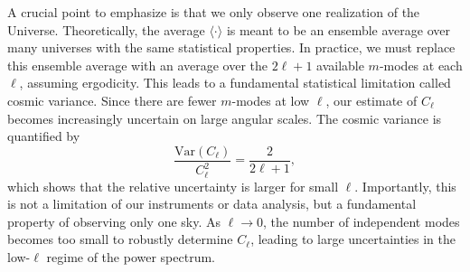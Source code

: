 \documentclass{aa}
\numberwithin{equation}{section}
\numberwithin{table}{section}
\numberwithin{figure}{section}
\begin{document}

A crucial point to emphasize is that we only observe one realization of the Universe. Theoretically, the average $\langle \cdot \rangle$ is meant to be an ensemble average over many universes with the same statistical properties. In practice, we must replace this ensemble average with an average over the $2\ell + 1$ available $m$-modes at each $\ell$, assuming ergodicity. 
This leads to a fundamental statistical limitation called cosmic variance. Since there are fewer $m$-modes at low $\ell$, our estimate of $C_\ell$ becomes increasingly uncertain on large angular scales. The cosmic variance is quantified by  
\begin{equation}
\frac{\mathrm{Var}(C_\ell)}{C_\ell^2} = \frac{2}{2\ell + 1},
\end{equation}
which shows that the relative uncertainty is larger for small $\ell$. Importantly, this is not a limitation of our instruments or data analysis, but a fundamental property of observing only one sky. As $\ell \to 0$, the number of independent modes becomes too small to robustly determine $C_\ell$, leading to large uncertainties in the low-$\ell$ regime of the power spectrum.
\end{document}

